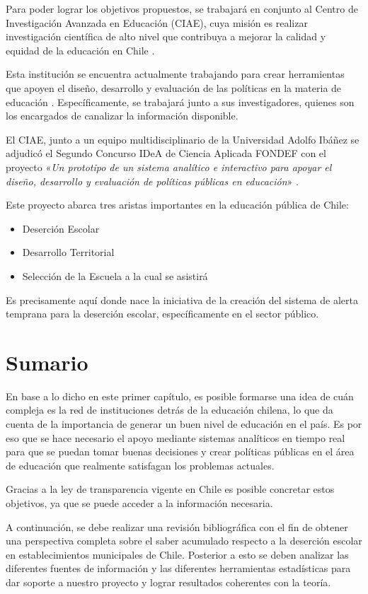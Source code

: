Para poder lograr los objetivos propuestos, se trabajará en conjunto al Centro de Investigación Avanzada en Educación (CIAE), cuya misión es realizar investigación científica de alto nivel que contribuya a mejorar la calidad y equidad de la educación en Chile \cite{ciae}.

Esta institución se encuentra actualmente trabajando para crear herramientas que apoyen el diseño, desarrollo y evaluación de las políticas en la materia de educación \cite{tools}. Específicamente, se  trabajará junto a sus investigadores, quienes son los encargados de canalizar la información disponible.

El CIAE, junto a un equipo multidisciplinario de la Universidad Adolfo Ibáñez se adjudicó el Segundo Concurso IDeA de Ciencia Aplicada FONDEF con el proyecto «\textit{Un prototipo de un sistema analítico e interactivo para apoyar el diseño, desarrollo y evaluación de políticas públicas en educación}» \cite{noticia}. 

Este proyecto abarca tres aristas importantes en la educación pública de Chile:
\begin{itemize}
    \item Deserción Escolar
    \item Desarrollo Territorial
    \item Selección de la Escuela a la cual se asistirá
\end{itemize}

Es precisamente aquí donde nace la iniciativa de la creación del sistema de alerta temprana para la deserción escolar, específicamente en el sector público. 

\section{Sumario}

En base a lo dicho en este primer capítulo, es posible formarse una idea de cuán compleja es la red de instituciones detrás de la educación chilena, lo que da cuenta de la importancia de generar un buen nivel de educación en el país. Es por eso que se hace necesario el apoyo mediante sistemas analíticos en tiempo real para que se puedan tomar buenas decisiones y crear políticas públicas en el área de educación que realmente satisfagan los problemas actuales. 

Gracias a la ley de transparencia vigente en Chile es posible concretar estos objetivos, ya que se puede acceder a la información necesaria.

A continuación, se debe realizar una revisión bibliográfica con el fin de obtener una perspectiva completa sobre el saber acumulado respecto a la deserción escolar en establecimientos municipales de Chile. Posterior a esto se deben analizar las diferentes fuentes de información y las diferentes herramientas estadísticas para dar soporte a nuestro proyecto y lograr resultados coherentes con la teoría. 